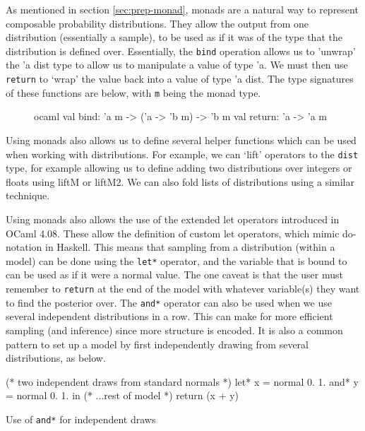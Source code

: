 As mentioned in section \ref{sec:prep-monad}, monads are a natural way to represent composable probability distributions. They allow the output from one distribution (essentially a sample), to be used as if it was of the type that the distribution is defined over. Essentially, the \texttt{bind} operation allows us to 'unwrap' the 'a dist type to allow us to manipulate a value of type 'a. We must then use \texttt{return} to `wrap' the value back into a value of type 'a dist. The type signatures of these functions are below, with \texttt{m} being the monad type.
\begin{figure}[!htb]
\centering
\begin{cminted}{ocaml}
val bind: 'a m -> ('a -> 'b m) -> 'b m
val return: 'a -> 'a m
\end{cminted}
\end{figure}
Using monads also allows us to define several helper functions which can be used when working with distributions. For example, we can `lift' operators to the \texttt{dist} type, for example allowing us to define adding two distributions over integers or floats using liftM or liftM2. We can also fold lists of distributions using a similar technique.
	
Using monads also allows the use of the extended let operators introduced in OCaml 4.08. These allow the definition of custom let operators, which mimic do-notation in Haskell. This means that sampling from a distribution (within a model) can be done using the \texttt{let*} operator, and the variable that is bound to can be used as if it were a normal value. The one caveat is that the user must remember to \texttt{return} at the end of the model with whatever variable(s) they want to find the posterior over. The \texttt{and*} operator can also be used when we use several independent distributions in a row. This can make for more efficient sampling (and inference) since more structure is encoded. It is also a common pattern to set up a model by first independently drawing from several distributions, as below.

\begin{listing}
\begin{ocamlcode-in}
(* two independent draws from standard normals *)
let* x = normal 0. 1.
and* y = normal 0. 1. in
(* ...rest of model  *)
return (x + y)
\end{ocamlcode-in}
\caption{Use of \texttt{and*} for independent draws}
\end{listing}

